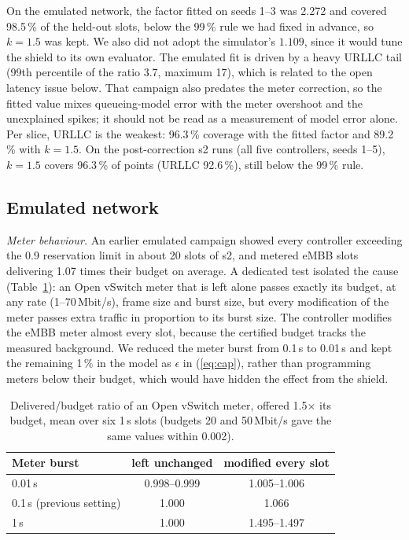 On the emulated network, the factor fitted on seeds 1--3 was 2.272 and covered
98.5\,\% of the held-out slots, below the 99\,\% rule we had fixed in advance, so
$k=1.5$ was kept. We also did not adopt the simulator's $1.109$, since it would tune
the shield to its own evaluator. The emulated fit is driven by a heavy URLLC tail
(99th percentile of the ratio 3.7, maximum 17), which is related to the open
latency issue below. That campaign also predates the meter correction, so the fitted
value mixes queueing-model error with the meter overshoot and the unexplained
spikes; it should not be read as a measurement of model error alone. Per slice,
URLLC is the weakest: 96.3\,\% coverage with the fitted factor and 89.2\,\% with
$k=1.5$. On the post-correction s2 runs (all five controllers, seeds 1--5),
$k=1.5$ covers 96.3\,\% of points (URLLC 92.6\,\%), still below the 99\,\% rule.

\subsection{Emulated network}
\label{sec:meter}

\emph{Meter behaviour.} An earlier emulated campaign showed every controller
exceeding the 0.9 reservation limit in about 20 slots of s2, and metered eMBB slots
delivering 1.07 times their budget on average. A dedicated test isolated the cause
(Table~\ref{tab:meter}): an Open vSwitch meter that is left alone passes exactly its
budget, at any rate (1--70\,Mbit/s), frame size and burst size, but every
modification of the meter passes extra traffic in proportion to its burst size. The
controller modifies the eMBB meter almost every slot, because the certified budget
tracks the measured background. We reduced the meter burst from 0.1\,s to 0.01\,s
and kept the remaining 1\,\% in the model as $\epsilon$ in (\ref{eq:cap}), rather
than programming meters below their budget, which would have hidden the effect from
the shield.

\begin{table}[t]
\caption{Delivered/budget ratio of an Open vSwitch meter, offered 1.5$\times$ its budget, mean over six 1\,s slots (budgets 20 and 50\,Mbit/s gave the same values within 0.002).}
\label{tab:meter}
\centering
\footnotesize
\begin{tabular}{@{}lcc@{}}
\toprule
Meter burst & left unchanged & modified every slot\\
\midrule
0.01\,s & 0.998--0.999 & 1.005--1.006\\
0.1\,s (previous setting) & 1.000 & 1.066\\
1\,s & 1.000 & 1.495--1.497\\
\bottomrule
\end{tabular}
\end{table}


